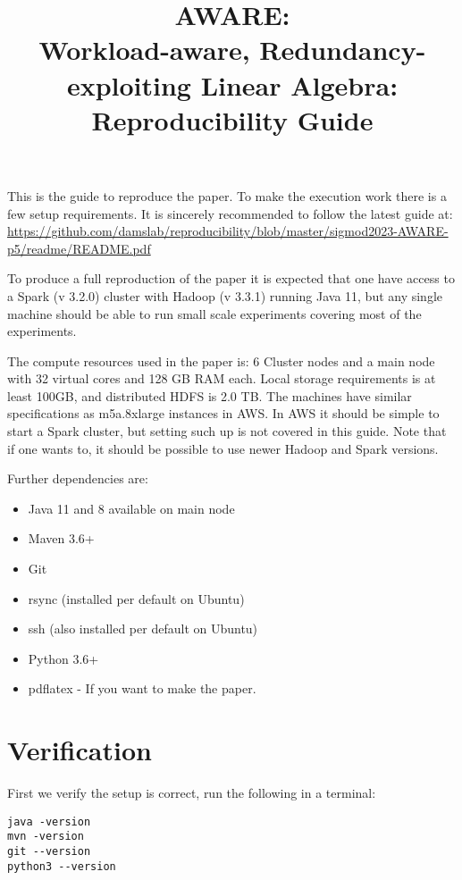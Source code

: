 \documentclass{readme}
\title{AWARE: \\ Workload-aware, Redundancy-exploiting Linear Algebra: \\ Reproducibility Guide}
\begin{document}
\maketitle

This is the guide to reproduce the paper.
To make the execution work there is a few setup requirements.
It is sincerely recommended to follow the latest guide at:
\url{https://github.com/damslab/reproducibility/blob/master/sigmod2023-AWARE-p5/readme/README.pdf}

To produce a full reproduction of the paper it is expected that one have access to a Spark (v 3.2.0) cluster with Hadoop (v 3.3.1) running Java 11, but any single machine should be able to run small scale experiments covering most of the experiments.

The compute resources used in the paper is: 6 Cluster nodes and a main node with 32 virtual cores and 128 GB RAM each. Local storage requirements is at least 100GB, and distributed HDFS is 2.0 TB.
The machines have similar specifications as m5a.8xlarge instances in AWS. In AWS it should be simple to start a Spark cluster, but setting such up is not covered in this guide.
Note that if one wants to, it should be possible to use newer Hadoop and Spark versions.

Further dependencies are:

\begin{itemize}
    \item Java 11 and 8 available on main node
    \item Maven 3.6+
    \item Git
    \item rsync (installed per default on Ubuntu)
    \item ssh (also installed per default on Ubuntu)
    \item Python 3.6+
    \item pdflatex - If you want to make the paper.
\end{itemize}

\section{Verification}

First we verify the setup is correct, run the following in a terminal:

\begin{lstlisting}
java -version
mvn -version
git --version
python3 --version
\end{lstlisting}
\end{document}
